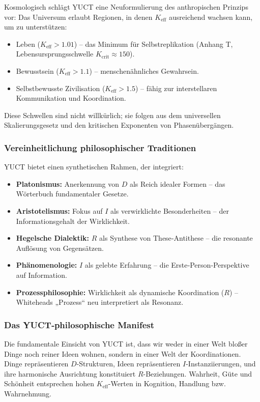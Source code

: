 \documentclass[12pt,a4paper]{article}
\newcommand{\eff}{\mathrm{eff}}
\newcommand{\Ke}{K_{\eff}}
\newcommand{\Kcrit}{K_{\mathrm{crit}}}
\begin{document}
	Kosmologisch schlägt YUCT eine Neuformulierung des anthropischen Prinzips vor: Das Universum erlaubt Regionen, in denen $\Ke$ ausreichend wachsen kann, um zu unterstützen:
	\begin{itemize}
		\item Leben ($\Ke > 1.01$) – das Minimum für Selbstreplikation (Anhang T, Lebensursprungsschwelle $\Kcrit \approx 150$).
		\item Bewusstsein ($\Ke > 1.1$) – menschenähnliches Gewahrsein.
		\item Selbstbewusste Zivilisation ($\Ke > 1.5$) – fähig zur interstellaren Kommunikation und Koordination.
	\end{itemize}
	
	Diese Schwellen sind nicht willkürlich; sie folgen aus dem universellen Skalierungsgesetz und den kritischen Exponenten von Phasenübergängen.
	
	\subsubsection{Vereinheitlichung philosophischer Traditionen}
	
	YUCT bietet einen synthetischen Rahmen, der integriert:
	\begin{itemize}
		\item \textbf{Platonismus:} Anerkennung von $D$ als Reich idealer Formen – das Wörterbuch fundamentaler Gesetze.
		\item \textbf{Aristotelismus:} Fokus auf $I$ als verwirklichte Besonderheiten – der Informationsgehalt der Wirklichkeit.
		\item \textbf{Hegelsche Dialektik:} $R$ als Synthese von These‑Antithese – die resonante Auflösung von Gegensätzen.
		\item \textbf{Phänomenologie:} $I$ als gelebte Erfahrung – die Erste‑Person‑Perspektive auf Information.
		\item \textbf{Prozessphilosophie:} Wirklichkeit als dynamische Koordination ($R$) – Whiteheads „Prozess“ neu interpretiert als Resonanz.
	\end{itemize}
	
	\subsubsection{Das YUCT‑philosophische Manifest}
	
	Die fundamentale Einsicht von YUCT ist, dass wir weder in einer Welt bloßer Dinge noch reiner Ideen wohnen, sondern in einer Welt der Koordinationen. Dinge repräsentieren $D$-Strukturen, Ideen repräsentieren $I$-Instanziierungen, und ihre harmonische Ausrichtung konstituiert $R$-Beziehungen. Wahrheit, Güte und Schönheit entsprechen hohen $\Ke$-Werten in Kognition, Handlung bzw. Wahrnehmung.
	
\end{document}
